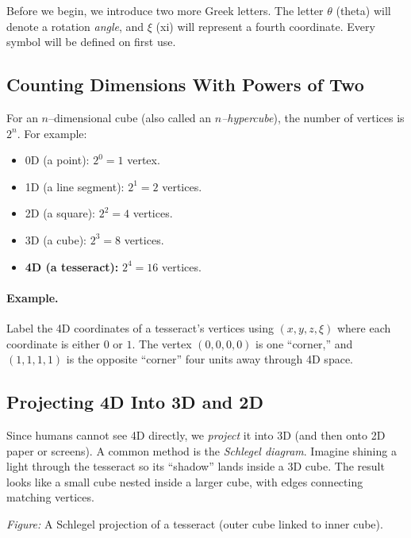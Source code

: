 \documentclass[12pt]{article}
\begin{document}
Before we begin, we introduce two more Greek letters. The letter $\theta$ (theta) will denote a rotation \emph{angle}, and $\xi$ (xi) will represent a fourth coordinate. Every symbol will be defined on first use.

\subsection*{Counting Dimensions With Powers of Two}
For an $n$–dimensional cube (also called an \emph{$n$–hypercube}), the number of vertices is $2^{n}$.  For example:
\begin{itemize}
  \item 0D (a point): $2^0 = 1$ vertex.
  \item 1D (a line segment): $2^1 = 2$ vertices.
  \item 2D (a square): $2^2 = 4$ vertices.
  \item 3D (a cube): $2^3 = 8$ vertices.
  \item \textbf{4D (a tesseract):} $2^4 = 16$ vertices.
\end{itemize}

\paragraph{Example.}  Label the 4D coordinates of a tesseract’s vertices using $(x, y, z, \xi)$ where each coordinate is either $0$ or $1$.  The vertex $(0,0,0,0)$ is one “corner,” and $(1,1,1,1)$ is the opposite “corner” four units away through 4D space.

\subsection*{Projecting 4D Into 3D and 2D}
Since humans cannot see 4D directly, we \emph{project} it into 3D (and then onto 2D paper or screens).  A common method is the \emph{Schlegel diagram}.  Imagine shining a light through the tesseract so its “shadow” lands inside a 3D cube.  The result looks like a small cube nested inside a larger cube, with edges connecting matching vertices.

\begin{center}
\end{center}
\vspace{-0.5em}
\emph{Figure:} A Schlegel projection of a tesseract (outer cube linked to inner cube).
\end{document}
